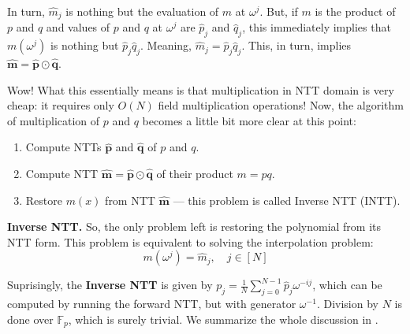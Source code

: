 \documentclass[../../book.tex]{subfiles}
\begin{document}
In turn, $\hat{m}_j$ is nothing but the evaluation of $m$ at $\omega^j$. But, if $m$ is the product of $p$ and $q$
and values of $p$ and $q$ at $\omega^j$ are $\hat{p}_j$ and $\hat{q}_j$, this immediately implies that 
$m(\omega^j)$ is nothing but $\hat{p}_j\hat{q}_j$. Meaning, $\hat{m}_j = \hat{p}_j\hat{q}_j$. This, in turn,
implies $\hat{\boldsymbol{m}} = \hat{\boldsymbol{p}} \odot \hat{\boldsymbol{q}}$.

Wow! What this essentially means is that multiplication in NTT domain is very cheap:
it requires only $O(N)$ field multiplication operations! Now, the algorithm 
of multiplication of $p$ and $q$ becomes a little bit more clear at this point:
\begin{enumerate}
    \item Compute NTTs $\hat{\boldsymbol{p}}$ and $\hat{\boldsymbol{q}}$ of $p$ and $q$.
    \item Compute NTT $\hat{\boldsymbol{m}} = \hat{\boldsymbol{p}} \odot \hat{\boldsymbol{q}}$ of their product $m = pq$.
    \item Restore $m(x)$ from NTT $\hat{\boldsymbol{m}}$ --- this problem is called Inverse NTT (INTT).
\end{enumerate}

\textcolor{green!60!black}{\textbf{Inverse NTT.}} So, the only problem left is restoring the polynomial from 
its NTT form. This problem is equivalent to solving the interpolation problem:
\begin{equation*}
    m(\omega^j) = \hat{m}_j, \quad j \in [N]
\end{equation*}

Suprisingly, the \textbf{Inverse NTT} is given by $p_j =
\frac{1}{N}\sum_{j=0}^{N-1}\hat{p}_j\omega^{-ij}$, which can be computed by
running the forward NTT, but with generator $\omega^{-1}$. Division by $N$ is
done over $\mathbb{F}_p$, which is surely trivial. We summarize the whole
discussion in .
\end{document}
